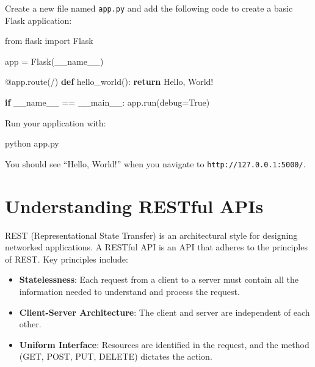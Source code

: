 \documentclass[
  letterpaper,
  DIV=11,
  numbers=noendperiod]{scrreprt}
\newenvironment{Shaded}{\begin{snugshade}}{\end{snugshade}}
\newcommand{\AttributeTok}[1]{\textcolor[rgb]{0.40,0.45,0.13}{#1}}
\newcommand{\ControlFlowTok}[1]{\textcolor[rgb]{0.00,0.23,0.31}{\textbf{#1}}}
\newcommand{\ExtensionTok}[1]{\textcolor[rgb]{0.00,0.23,0.31}{#1}}
\newcommand{\ImportTok}[1]{\textcolor[rgb]{0.00,0.46,0.62}{#1}}
\newcommand{\KeywordTok}[1]{\textcolor[rgb]{0.00,0.23,0.31}{\textbf{#1}}}
\newcommand{\NormalTok}[1]{\textcolor[rgb]{0.00,0.23,0.31}{#1}}
\newcommand{\OperatorTok}[1]{\textcolor[rgb]{0.37,0.37,0.37}{#1}}
\newcommand{\StringTok}[1]{\textcolor[rgb]{0.13,0.47,0.30}{#1}}
\newcommand{\VariableTok}[1]{\textcolor[rgb]{0.07,0.07,0.07}{#1}}
\providecommand{\tightlist}{%
  \setlength{\itemsep}{0pt}\setlength{\parskip}{0pt}}\usepackage{longtable,booktabs,array}
\begin{document}
Create a new file named \texttt{app.py} and add the following code to
create a basic Flask application:

\begin{Shaded}
\begin{Highlighting}[]
\ImportTok{from}\NormalTok{ flask }\ImportTok{import}\NormalTok{ Flask}

\NormalTok{app }\OperatorTok{=}\NormalTok{ Flask(}\VariableTok{\_\_name\_\_}\NormalTok{)}

\AttributeTok{@app.route}\NormalTok{(}\StringTok{\textquotesingle{}/\textquotesingle{}}\NormalTok{)}
\KeywordTok{def}\NormalTok{ hello\_world():}
    \ControlFlowTok{return} \StringTok{\textquotesingle{}Hello, World!\textquotesingle{}}

\ControlFlowTok{if} \VariableTok{\_\_name\_\_} \OperatorTok{==} \StringTok{\textquotesingle{}\_\_main\_\_\textquotesingle{}}\NormalTok{:}
\NormalTok{    app.run(debug}\OperatorTok{=}\VariableTok{True}\NormalTok{)}
\end{Highlighting}
\end{Shaded}

Run your application with:

\begin{Shaded}
\begin{Highlighting}[]
\ExtensionTok{python}\NormalTok{ app.py}
\end{Highlighting}
\end{Shaded}

You should see ``Hello, World!'' when you navigate to
\texttt{http://127.0.0.1:5000/}.

\section{Understanding RESTful APIs}\label{understanding-restful-apis}

REST (Representational State Transfer) is an architectural style for
designing networked applications. A RESTful API is an API that adheres
to the principles of REST. Key principles include:

\begin{itemize}
\tightlist
\item
  \textbf{Statelessness}: Each request from a client to a server must
  contain all the information needed to understand and process the
  request.
\item
  \textbf{Client-Server Architecture}: The client and server are
  independent of each other.
\item
  \textbf{Uniform Interface}: Resources are identified in the request,
  and the method (GET, POST, PUT, DELETE) dictates the action.
\end{itemize}
\end{document}
